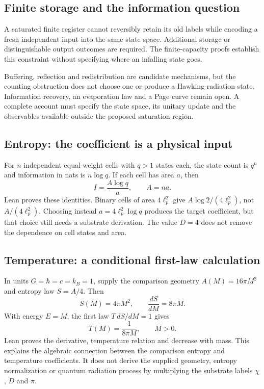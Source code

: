 \subsection{Finite storage and the information question}
A saturated finite register cannot reversibly retain its old labels while encoding a fresh independent input into the same state space. Additional storage or distinguishable output outcomes are required. The finite-capacity proofs establish this constraint without specifying where an infalling state goes.

Buffering, reflection and redistribution are candidate mechanisms, but the counting obstruction does not choose one or produce a Hawking-radiation state. Information recovery, an evaporation law and a Page curve remain open. A complete account must specify the state space, its unitary update and the observables available outside the proposed saturation region.

\subsection{Entropy: the coefficient is a physical input}
For $n$ independent equal-weight cells with $q>1$ states each, the state count is $q^n$ and information in nats is $n\log q$. If each cell has area $a$, then
\begin{equation}
I=\frac{A\log q}{a},\qquad A=na.
\end{equation}
Lean proves these identities. Binary cells of area $4\ell_p^2$ give $A\log2/(4\ell_p^2)$, not $A/(4\ell_p^2)$. Choosing instead $a=4\ell_p^2\log q$ produces the target coefficient, but that choice still needs a substrate derivation. The value $D=4$ does not remove the dependence on cell states and area.

\subsection{Temperature: a conditional first-law calculation}
In units $G=\hbar=c=k_B=1$, supply the comparison geometry $A(M)=16\pi M^2$ and entropy law $S=A/4$. Then
\begin{equation}
S(M)=4\pi M^2,\qquad \frac{dS}{dM}=8\pi M.
\end{equation}
With energy $E=M$, the first law $T\,dS/dM=1$ gives
\begin{equation}
T(M)=\frac{1}{8\pi M},\qquad M>0.
\end{equation}
Lean proves the derivative, temperature relation and decrease with mass. This explains the algebraic connection between the comparison entropy and temperature coefficients. It does not derive the supplied geometry, entropy normalization or quantum radiation process by multiplying the substrate labels $\chi$, $D$ and $\pi$.
